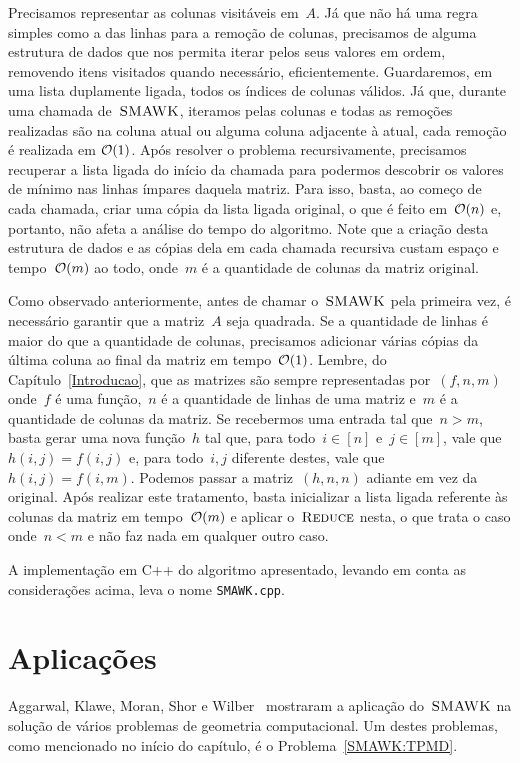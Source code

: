 Precisamos representar as colunas visitáveis em~$A$. Já que não há uma regra simples como a das linhas para a remoção de colunas, precisamos de alguma estrutura de dados que nos permita iterar pelos seus valores em ordem, removendo itens visitados quando necessário, eficientemente. Guardaremos, em uma lista duplamente ligada, todos os índices de colunas válidos. Já que, durante uma chamada de~$\textsc{SMAWK}$, iteramos pelas colunas e todas as remoções realizadas são na coluna atual ou alguma coluna adjacente à atual, cada remoção é realizada em $\mathcal{O}(1)$. Após resolver o problema recursivamente, precisamos recuperar a lista ligada do início da chamada para podermos descobrir os valores de mínimo nas linhas ímpares daquela matriz. Para isso, basta, ao começo de cada chamada, criar uma cópia da lista ligada original, o que é feito em~$\mathcal{O}(n)$ e, portanto, não afeta a análise do tempo do algoritmo. Note que a criação desta estrutura de dados e as cópias dela em cada chamada recursiva custam espaço e tempo~$\mathcal{O}(m)$ ao todo, onde~$m$ é a quantidade de colunas da matriz original.

Como observado anteriormente, antes de chamar o~$\textsc{SMAWK}$ pela primeira vez, é necessário garantir que a matriz~$A$ seja quadrada. Se a quantidade de linhas é maior do que a quantidade de colunas, precisamos adicionar várias cópias da última coluna ao final da matriz em tempo~$\mathcal{O}(1)$. Lembre, do Capítulo~\ref{Introducao}, que as matrizes são sempre representadas por~$(f,n,m)$ onde~$f$ é uma função,~$n$ é a quantidade de linhas de uma matriz e~$m$ é a quantidade de colunas da matriz. Se recebermos uma entrada tal que~${ n > m }$, basta gerar uma nova função~$h$ tal que, para todo~${ i \in [n] }$ e~${ j \in [m] }$, vale que~${ h(i,j) = f(i,j) }$ e, para todo~$i,j$ diferente destes, vale que~${ h(i,j) = f(i,m) }$. Podemos passar a matriz~$(h,n,n)$ adiante em vez da original. Após realizar este tratamento, basta inicializar a lista ligada referente às colunas da matriz em tempo~$\mathcal{O}(m)$ e aplicar o~$\textsc{Reduce}$ nesta, o que trata o caso onde~${ n < m }$ e não faz nada em qualquer outro caso.
 
A implementação em C++ do algoritmo apresentado, levando em conta as considerações acima, leva o nome \texttt{SMAWK.cpp}.


\section{Aplicações} \label{SMAWK:Appl}
Aggarwal, Klawe, Moran, Shor e Wilber~\cite{Aggarwal:1987} mostraram a aplicação do~$\textsc{SMAWK}$ na solução de vários problemas de geometria computacional. Um destes problemas, como mencionado no início do capítulo, é o Problema~\ref{SMAWK:TPMD}.

